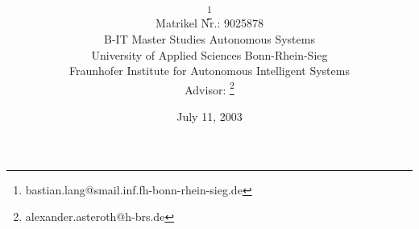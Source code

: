 \title{\PaperTitle\\\PaperSubject}
\author{\href{\PaperMainWriterEMail}{\PaperMainWriter \footnote{\href{\PaperMainWriterEMail} {bastian.lang@smail.inf.fh-bonn-rhein-sieg.de}} 
}\\%
Matrikel Nr.: 9025878 \vspace{0.5cm} \\ 
B-IT Master Studies Autonomous Systems \vspace{0.5cm} \\ 
University of Applied Sciences Bonn-Rhein-Sieg\\ %
Fraunhofer Institute for Autonomous Intelligent Systems \vspace{0.7cm} \\ \setcounter{footnote}{6}
Advisor: \href{\PaperLecturerEMail}{\PaperLecturer \footnote{\href{\PaperLecturerEMail} {alexander.asteroth@h-brs.de}}} \\ 
}%
\date{July 11, 2003}
\maketitle
